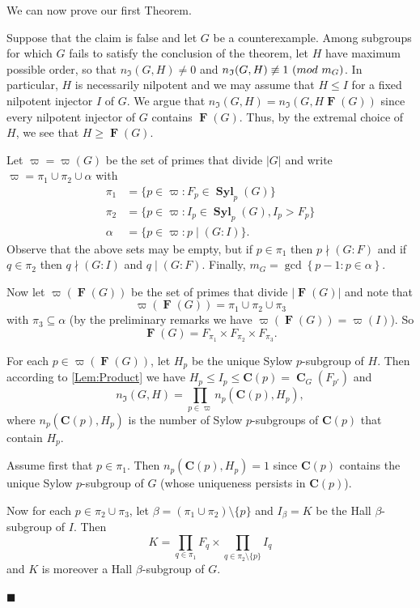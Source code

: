 \documentclass[10pt,a4paper]{amsart}
\numberwithin{equation}{section}
\DeclareMathOperator{\fitt}{\mathbf{F}}
\DeclareMathOperator{\cent}{\mathbf{C}}
\DeclareMathOperator{\syl}{\mathbf{Syl}}
\newcommand{\card}[1]{\left\lvert{#1}\right\rvert}
\renewcommand{\leq}{\leqslant}
\renewcommand{\geq}{\geqslant}
\newcommand{\md}[1]{\,\left(\textnormal{mod}\ #1\right)}
\newenvironment{proofofA}{{\bf {Proof of Theorem \ref{Thm:A}.} }}{\hfill $\blacksquare$ \\}
\def\C_p{{\mathbf{C}(p)}}
\begin{document}
We can now prove our first Theorem.

\begin{proofofA}
Suppose that the claim is false and let $G$ be a counterexample.
Among subgroups for which $G$ fails to satisfy the conclusion of the theorem,
let $H$ have maximum possible order, 
so that $n_\mathfrak{I}(G, H) \neq 0$ 
and $n_\mathfrak{I}(G, H) \not\equiv 1\md{m_G}$.
In particular, $H$ is necessarily nilpotent and we may assume that $H \leq I$ 
for a fixed nilpotent injector $I$ of $G$. 
We argue that $n_\mathfrak{I}(G, H) = n_\mathfrak{I}(G, H \fitt(G))$
since every nilpotent injector of $G$ contains $\fitt(G)$.
Thus, by the extremal choice of $H$, we see that $H \geq \fitt(G)$.

Let $\varpi = \varpi(G)$ be the set of primes that divide $\card{G}$ and write 
$\varpi= \pi_1 \cup \pi_2 \cup \alpha$ with 
\begin{align*}
\pi_1  &= \{ p \in \varpi  : F_p \in \syl_p(G) \}\\
\pi_2  &= \{ p \in \varpi : I_p \in \syl_p(G), I_p > F_p \}\\
\alpha &= \{ p \in \varpi : p \mid (G:I)\}.  
\end{align*}
Observe that the above sets may be empty, 
but if $p \in \pi_1$ then $p \nmid (G : F)$  
and if $q \in \pi_2$ then $q \nmid (G : I)$ and $q \mid (G : F)$. 
Finally, $m_G =  \gcd\left\{ p - 1 : p \in \alpha \right\}$. 
		
Now let $\varpi(\fitt(G))$ be the set of primes that divide $\card{\fitt(G)}$ 
and note that 
\[
\varpi(\fitt(G))= \pi_1 \cup \pi_2 \cup \pi_3
\]
with $\pi_3 \subseteq \alpha$ 
(by the preliminary remarks we have $\varpi(\fitt(G)) = \varpi(I)$). 
So 
\[
\fitt(G) = F_{\pi_1} \times F_{\pi_2} \times F_{\pi_3}.
\]
		
For each $p \in \varpi(\fitt(G))$, 
let $H_p$ be the unique Sylow $p$-subgroup of $H$. Then according to \autoref{Lem:Product} we have  $H_p \leq I_p \leq \C_p = \cent_G(F_{p'})$ and 
\[
n_\mathfrak{I}(G, H) = \prod_{p \in \varpi} n_p(\C_p, H_p),
\]
where  $n_p(\C_p, H_p)$ is the number of Sylow $p$-subgroups of $\C_p$ that contain $H_p$.
		
Assume  first that  $p \in \pi_1$. 
Then $n_p(\C_p, H_p)= 1$ 
since $\C_p$ contains the unique Sylow $p$-subgroup of $G$
(whose uniqueness persists in $\C_p$).
		
Now for each $p \in \pi_2 \cup \pi_3$, 
let $\beta = (\pi_1 \cup \pi_2 ) \setminus \{ p\}$ 
and $I_{\beta}= K$ be the Hall $\beta$-subgroup of $I$. 
Then 
\[
K = \prod_{q \in \pi_1} F_q \times \prod_{q \in \pi_2 \setminus \{p\} } I_q
\]
and $K$ is moreover a Hall $\beta$-subgroup of $G$.
		

\end{proofofA}
\end{document}
